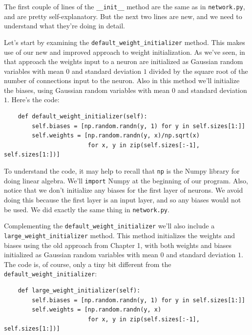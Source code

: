 The first couple of lines of the \texttt{\_\allowbreak{}\_\allowbreak{}init\_\allowbreak{}\_\allowbreak{}} method are the same as in \texttt{network.py}, and are pretty self-explanatory. But the next two lines are new, and we need to understand what they're doing in detail.


Let's start by examining the \texttt{default\_\allowbreak{}weight\_\allowbreak{}initializer} method. This makes use of our new and improved approach to weight initialization. As we've seen, in that approach the weights input to a neuron are initialized as Gaussian random variables with mean 0 and standard deviation $1$ divided by the square root of the number of connections input to the neuron. Also in this method we'll initialize the biases, using Gaussian random variables with mean $0$ and standard deviation $1$. Here's the code:



\begin{lstlisting}
    def default_weight_initializer(self):
        self.biases = [np.random.randn(y, 1) for y in self.sizes[1:]]
        self.weights = [np.random.randn(y, x)/np.sqrt(x) 
                        for x, y in zip(self.sizes[:-1], self.sizes[1:])]

\end{lstlisting}


To understand the code, it may help to recall that \texttt{np} is the Numpy library for doing linear algebra. We'll \texttt{import} Numpy at the beginning of our program. Also, notice that we don't initialize any biases for the first layer of neurons. We avoid doing this because the first layer is an input layer, and so any biases would not be used. We did exactly the same thing in \texttt{network.py}.


Complementing the \texttt{default\_\allowbreak{}weight\_\allowbreak{}initializer} we'll also include a \texttt{large\_\allowbreak{}weight\_\allowbreak{}initializer} method. This method initializes the weights and biases using the old approach from Chapter 1, with both weights and biases initialized as Gaussian random variables with mean $0$ and standard deviation $1$. The code is, of course, only a tiny bit different from the \texttt{default\_\allowbreak{}weight\_\allowbreak{}initializer}:



\begin{lstlisting}
    def large_weight_initializer(self):
        self.biases = [np.random.randn(y, 1) for y in self.sizes[1:]]
        self.weights = [np.random.randn(y, x) 
                        for x, y in zip(self.sizes[:-1], self.sizes[1:])]

\end{lstlisting}


